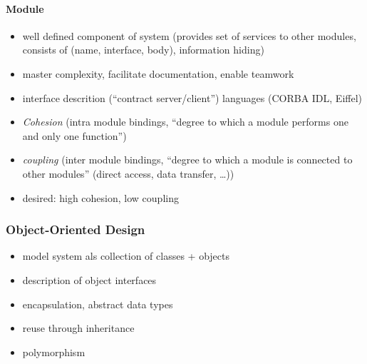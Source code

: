 \documentclass[a4paper, 10pt]{article}
\begin{document}
\paragraph{Module}
\begin{itemize}
	\item well defined component of system (provides set of services to other modules, consists of (name, interface, body), information hiding)
	\item master complexity, facilitate documentation, enable teamwork
	\item interface descrition (``contract server/client'') languages (CORBA IDL, Eiffel)
	\item \emph{Cohesion} (intra module bindings, ``degree to which a module performs one and only one function'')
	\item \emph{coupling} (inter module bindings, ``degree to which a module is connected to other modules'' (direct access, data transfer, \dots))
	\item desired: high cohesion, low coupling
\end{itemize}

\subsubsection{Object-Oriented Design}
\begin{itemize}
	\item model system als collection of classes + objects
	\item description of object interfaces
	\item encapsulation, abstract data types
	\item reuse through inheritance
	\item polymorphism
\end{itemize}
\end{document}
